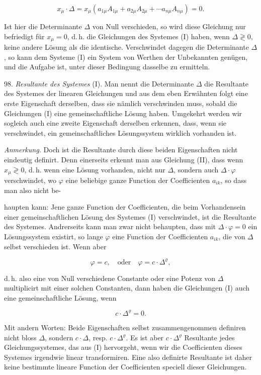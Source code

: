 \documentclass[11pt]{article}
\providecommand{\weberpage}[1]{}
\providecommand{\weq}[2]{\begin{equation}\tag{#1}#2\end{equation}}
\let\Delta\varDelta
\begin{document}
\weq{II}{x_\mu\cdot\Delta = x_\mu(a_{1\mu}A_{1\mu}+a_{2\mu}A_{2\mu}+\cdots a_{n\mu}A_{n\mu})=0.}

Ist hier die Determinante $\Delta$ von Null verschieden, so wird diese
Gleichung nur befriedigt für $x_\mu=0$, d.\,h. die Gleichungen des
Systemes (I) haben, wenn $\Delta \gtrless 0$, keine andere Lösung als
die identische. Verschwindet dagegen die Determinante $\Delta$, so kann
dem Systeme (I) ein System von Werthen der Unbekannten genügen, und
die Aufgabe ist, unter dieser Bedingung dasselbe zu ermitteln.

98. \textit{Resultante des Systemes} (I). Man nennt die Determinante
$\Delta$ die Resultante des Systemes der linearen Gleichungen und aus
dem eben Erwähnten folgt eine erste Eigenschaft derselben, dass sie
nämlich verschwinden muss, sobald die Gleichungen (I) eine
gemeinschaftliche Lösung haben. Umgekehrt werden wir sogleich auch
eine zweite Eigenschaft derselben erkennen, dass, wenn sie verschwindet,
ein gemeinschaftliches Lösungssystem wirklich vorhanden ist.

\textit{Anmerkung.} Doch ist die Resultante durch diese beiden
Eigenschaften nicht eindeutig definirt. Denn einerseits erkennt man aus
Gleichung (II), dass wenn $x_\mu \gtrless 0$, d.\,h. wenn eine Lösung
vorhanden, nicht nur $\Delta$, sondern auch $\Delta\cdot\varphi$
verschwindet, wo $\varphi$ eine beliebige ganze Function der
Coefficienten $a_{ik}$, so dass man also nicht be-


\weberpage{103}
haupten kann: Jene ganze Function der Coefficienten, die beim
Vorhandensein einer gemeinschaftlichen Lösung des Systemes (I)
verschwindet, ist die Resultante des Systemes. Andrerseits kann man
zwar nicht behaupten, dass mit $\Delta\cdot\varphi=0$ ein
Lösungssystem existirt, so lange $\varphi$ eine Function der
Coefficienten $a_{ik}$, die von $\Delta$ selbst verschieden ist. Wenn
aber

\[
\varphi=c, \quad \text{oder} \quad \varphi=c\cdot\Delta^{\varrho},
\]

d.\,h. also eine von Null verschiedene Constante oder eine Potenz von
$\Delta$ multiplicirt mit einer solchen Constanten, dann haben die
Gleichungen (I) auch eine gemeinschaftliche Lösung, wenn

\[
c\cdot\Delta^{\varrho}=0.
\]

Mit andern Worten: Beide Eigenschaften selbst zusammengenommen
definiren nicht bloss $\Delta$, sondern $c\cdot\Delta$, resp.
$c\cdot\Delta^{\varrho}$. Es ist aber $c\cdot\Delta^{\varrho}$
Resultante jedes Gleichungssystemes, das aus (I) hervorgeht, wenn wir
die Coefficienten dieses Systemes irgendwie linear transformiren. Eine
also definirte Resultante ist daher keine bestimmte lineare Function
der Coefficienten speciell dieser Gleichungen.
\end{document}

